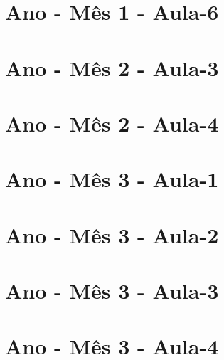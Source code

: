 \begin{multicols}{2}
\section[\sffamily 1\textordmasculine\space Ano - M\^{e}s 1 - Aula-6]{\textordmasculine\space Ano - M\^{e}s 1 - Aula-6}


\section[\sffamily 1\textordmasculine\space Ano - M\^{e}s 2 - Aula-3]{\textordmasculine\space Ano - M\^{e}s 2 - Aula-3}


\section[\sffamily 1\textordmasculine\space Ano - M\^{e}s 2 - Aula-4]{\textordmasculine\space Ano - M\^{e}s 2 - Aula-4}


\section[\sffamily 1\textordmasculine\space Ano - M\^{e}s 3 - Aula-1]{\textordmasculine\space Ano - M\^{e}s 3 - Aula-1}


\section[\sffamily 1\textordmasculine\space Ano - M\^{e}s 3 - Aula-2]{\textordmasculine\space Ano - M\^{e}s 3 - Aula-2}


\section[\sffamily 1\textordmasculine\space Ano - M\^{e}s 3 - Aula-3]{\textordmasculine\space Ano - M\^{e}s 3 - Aula-3}


\section[\sffamily 1\textordmasculine\space Ano - M\^{e}s 3 - Aula-4]{\textordmasculine\space Ano - M\^{e}s 3 - Aula-4}



\end{multicols}
